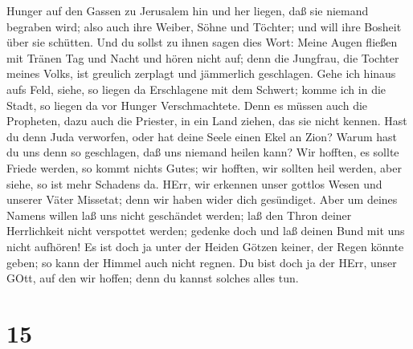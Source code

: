 Hunger auf den Gassen zu Jerusalem hin und her liegen, daß sie niemand
begraben wird; also auch ihre Weiber, Söhne und Töchter; und will ihre
Bosheit über sie schütten.  Und du sollst zu ihnen sagen
dies Wort: Meine Augen fließen mit Tränen Tag und Nacht und hören nicht
auf; denn die Jungfrau, die Tochter meines Volks, ist greulich zerplagt
und jämmerlich geschlagen.  Gehe ich hinaus aufs Feld,
siehe, so liegen da Erschlagene mit dem Schwert; komme ich in die Stadt,
so liegen da vor Hunger Verschmachtete. Denn es müssen auch die
Propheten, dazu auch die Priester, in ein Land ziehen, das sie nicht
kennen.  Hast du denn Juda verworfen, oder hat deine Seele
einen Ekel an Zion? Warum hast du uns denn so geschlagen, daß uns
niemand heilen kann? Wir hofften, es sollte Friede werden, so kommt
nichts Gutes; wir hofften, wir sollten heil werden, aber siehe, so ist
mehr Schadens da.  HErr, wir erkennen unser gottlos Wesen
und unserer Väter Missetat; denn wir haben wider dich gesündiget.
 Aber um deines Namens willen laß uns nicht geschändet
werden; laß den Thron deiner Herrlichkeit nicht verspottet werden;
gedenke doch und laß deinen Bund mit uns nicht aufhören! 
Es ist doch ja unter der Heiden Götzen keiner, der Regen könnte geben;
so kann der Himmel auch nicht regnen. Du bist doch ja der HErr, unser
GOtt, auf den wir hoffen; denn du kannst solches alles tun.

\hypertarget{section-14}{%
\section{15}\label{section-14}}

